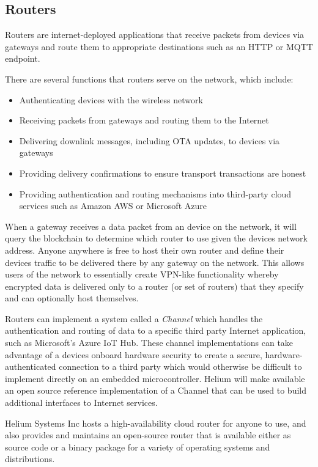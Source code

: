 \documentclass[letterpaper,11pt]{article}
\begin{document}
\subsection{Routers}

Routers are internet-deployed applications that receive packets from devices via gateways and route them to appropriate destinations such as an HTTP or MQTT endpoint.

There are several functions that routers serve on the network, which include:

\begin{itemize}
    \item Authenticating devices with the wireless network
    \item Receiving packets from gateways and routing them to the Internet
    \item Delivering downlink messages, including OTA updates, to devices via gateways
    \item Providing delivery confirmations to ensure transport transactions are honest
    \item Providing authentication and routing mechanisms into third-party cloud services such as Amazon AWS or Microsoft Azure
\end{itemize}

When a gateway receives a data packet from an device on the network, it will query the blockchain to determine which router to use given the devices network address. Anyone anywhere is free to host their own router and define their devices traffic to be delivered there by any gateway on the network. This allows users of the network to essentially create VPN-like functionality whereby encrypted data is delivered only to a router (or set of routers) that they specify and can optionally host themselves.

Routers can implement a system called a \emph{Channel} which handles the authentication and routing of data to a specific third party Internet application, such as Microsoft's Azure IoT Hub\cite{azure}. These channel implementations can take advantage of a devices onboard hardware security to create a secure, hardware-authenticated connection to a third party which would otherwise be difficult to implement directly on an embedded microcontroller. Helium will make available an open source reference implementation of a Channel that can be used to build additional interfaces to Internet services.

Helium Systems Inc hosts a high-availability cloud router for anyone to use, and also provides and maintains an open-source router that is available either as source code or a binary package for a variety of operating systems and distributions.
\end{document}
